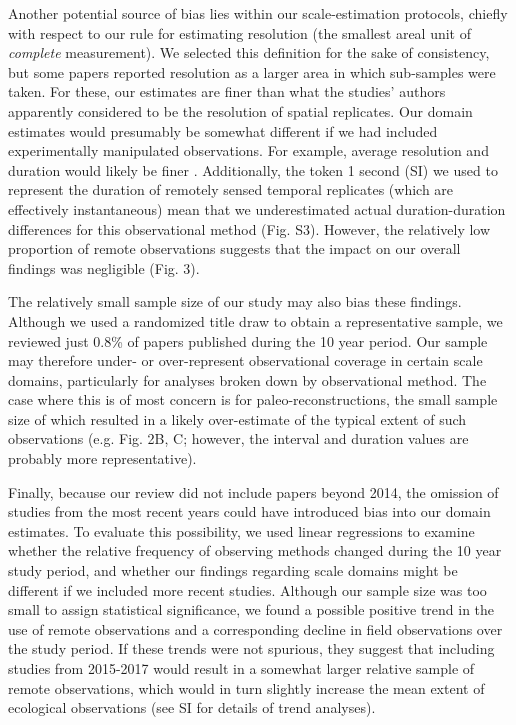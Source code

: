 \documentclass[12pt]{article}
\begin{document}
Another potential source of bias lies within our scale-estimation protocols, chiefly with respect to our rule for estimating resolution (the smallest areal unit of \emph{complete} measurement). We selected this definition for the sake of consistency, but some papers reported resolution as a larger area in which sub-samples were taken. For these, our estimates are finer than what the studies' authors apparently considered to be the resolution of spatial replicates. Our domain estimates would presumably be somewhat different if we had included experimentally manipulated observations. For example, average resolution and duration would likely be finer \cite{tilman_ecological_1989,kareiva_spatial_1988}. Additionally, the token 1 second (SI) we used to represent the duration of remotely sensed temporal replicates (which are effectively instantaneous) mean that we underestimated actual duration-duration differences for this observational method (Fig. S3). However, the relatively low proportion of remote observations suggests that the impact on our overall findings was negligible (Fig. 3).  

The relatively small sample size of our study may also bias these findings. Although we used a randomized title draw to obtain a representative sample, we reviewed just 0.8\% of papers published during the 10 year period. Our sample may therefore under- or over-represent observational coverage in certain scale domains, particularly for analyses broken down by observational method. The case where this is of most concern is for paleo-reconstructions, the small sample size of which resulted in a likely over-estimate of the typical extent of such observations (e.g. Fig. 2B, C; however, the interval and duration values are probably more representative).     

Finally, because our review did not include papers beyond 2014, the omission of studies from the most recent years could have introduced bias into our domain estimates. To evaluate this possibility, we used linear regressions to examine whether the relative frequency of observing methods changed during the 10 year study period, and whether our findings regarding scale domains might be different if we included more recent studies. Although our sample size was too small to assign statistical significance, we found a possible positive trend in the use of remote observations and a corresponding decline in field observations over the study period. If these trends were not spurious, they suggest that including studies from 2015-2017 would result in a somewhat larger relative sample of remote observations, which would in turn slightly increase the mean extent of ecological observations (see SI for details of trend analyses).   
\end{document}
